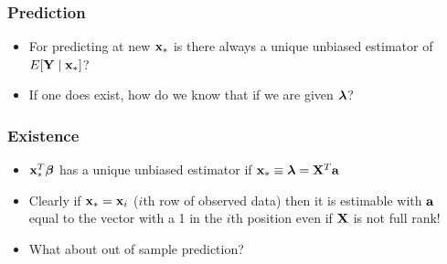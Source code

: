 \documentclass[handout]{beamer}\usepackage[]{graphicx}\usepackage[]{color}
\begin{document}
\begin{frame} \frametitle{Prediction}
  \begin{itemize}
  \item   For predicting at new $\mathbf{x}_*$ is there always a unique unbiased
  estimator of $E[\mathbf{Y} \mid \mathbf{x}_*]$? \pause
\item If one does exist, how do we know that if we are given $\boldsymbol{\lambda}$?

  \end{itemize}

\end{frame}
\begin{frame} \frametitle{Existence}
  \begin{itemize}
  \item  $\mathbf{x}_*^T \boldsymbol{\beta}$ has a unique unbiased estimator if $\mathbf{x}_* \equiv
    \boldsymbol{\lambda} = \mathbf{X}^T \mathbf{a}$ \pause
\item Clearly if $\mathbf{x}_* = \mathbf{x}_i$ ($i$th row of observed data) then it is
  estimable with $\mathbf{a}$ equal to the vector with a 1 in the $i$th position
  even if $\mathbf{X}$ is not full rank! \pause
\item What about out of sample prediction? \pause
\end{itemize}

\end{frame}
\end{document}
